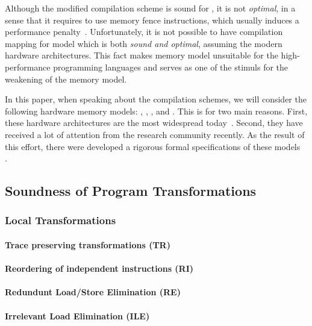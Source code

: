 Although the modified compilation scheme is sound for \SC, 
it is not \emph{optimal}, in a sense that 
it requires to use memory fence instructions, 
which usually induces a performance penalty~\cite{Marino-al:PLDI11, Liu-al:OOPSLA17}.
Unfortunately, it is not possible to have compilation mapping 
for \SC model which is both \emph{sound and optimal}, 
assuming the modern hardware architectures.     
This fact makes \SC memory model unsuitable  
for the high-performance programming languages
and serves as one of the stimuls for the weakening 
of the memory model. 
 
In this paper, when speaking about the compilation schemes, 
we will consider the following hardware memory models:
\xTSO, \POWER, , and . 
This is for two main reasons. 
First, these hardware architectures are the 
most widespread today~\cite{}. 
Second, they have received a lot of attention 
from the research community recently. 
As the result of this effort, 
there were developed a rigorous formal 
specifications of these models~%
\cite{Sewell-al:CACM10, Sarkar-al:PLDI11, 
Flur-al:POPL16, Pulte-al:POPL18}. 

\subsection{Soundness of Program Transformations}
\label{sec:background:trans}

\subsubsection{Local Transformations}

\paragraph{Trace preserving transformations (TR)}

\paragraph{Reordering of independent instructions (RI)}

\paragraph{Redundunt Load/Store Elimination (RE)}

\paragraph{Irrelevant Load Elimination (ILE)}

